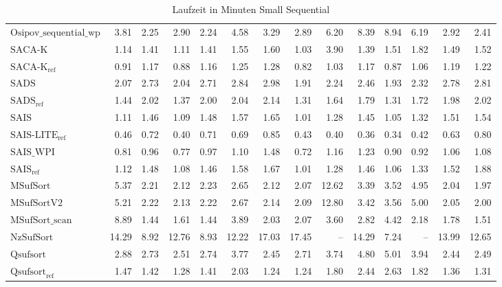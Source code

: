 \begin{table}
{\begin{tabular}{lrrrrrrrrrrrrr}
    $\text{Osipov\_sequential\_wp}$ & 3.81 & 2.25 & 2.90 & 2.24 & 4.58 & 3.29 & 2.89 & 6.20 & 8.39 & 8.94 & 6.19 & 2.92 & 2.41 \\
    $\text{SACA-K}$ & 1.14 & 1.41 & 1.11 & 1.41 & 1.55 & 1.60 & 1.03 & 3.90 & 1.39 & 1.51 & 1.82 & 1.49 & 1.52 \\
    $\text{SACA-K}_{\text{ref}}$ & 0.91 & 1.17 & 0.88 & 1.16 & 1.25 & 1.28 & 0.82 & 1.03 & 1.17 & 0.87 & 1.06 & 1.19 & 1.22 \\
    $\text{SADS}$ & 2.07 & 2.73 & 2.04 & 2.71 & 2.84 & 2.98 & 1.91 & 2.24 & 2.46 & 1.93 & 2.32 & 2.78 & 2.81 \\
    $\text{SADS}_{\text{ref}}$ & 1.44 & 2.02 & 1.37 & 2.00 & 2.04 & 2.14 & 1.31 & 1.64 & 1.79 & 1.31 & 1.72 & 1.98 & 2.02 \\
    $\text{SAIS}$ & 1.11 & 1.46 & 1.09 & 1.48 & 1.57 & 1.65 & 1.01 & 1.28 & 1.45 & 1.05 & 1.32 & 1.51 & 1.54 \\
    $\text{SAIS-LITE}_{\text{ref}}$ & {\color{green!60!black}0.46} & 0.72 & {\color{green!60!black}0.40} & 0.71 & 0.69 & 0.85 & {\color{green!60!black}0.43} & {\color{green!60!black}0.40} & {\color{green!60!black}0.36} & {\color{green!60!black}0.34} & {\color{green!60!black}0.42} & 0.63 & 0.80 \\
    $\text{SAIS\_WPI}$ & 0.81 & 0.96 & 0.77 & 0.97 & 1.10 & 1.48 & 0.72 & 1.16 & 1.23 & 0.90 & 0.92 & 1.06 & 1.08 \\
    $\text{SAIS}_{\text{ref}}$ & 1.12 & 1.48 & 1.08 & 1.46 & 1.58 & 1.67 & 1.01 & 1.28 & 1.46 & 1.06 & 1.33 & 1.52 & 1.88 \\
    $\text{MSufSort}$ & 5.37 & 2.21 & 2.12 & 2.23 & 2.65 & 2.12 & 2.07 & {\color{red}12.62} & 3.39 & 3.52 & 4.95 & 2.04 & 1.97 \\
    $\text{MSufSortV2}$ & 5.21 & 2.22 & 2.13 & 2.22 & 2.67 & 2.14 & 2.09 & {\color{red}12.80} & 3.42 & 3.56 & 5.00 & 2.05 & 2.00 \\
    $\text{MSufSort\_scan}$ & 8.89 & 1.44 & 1.61 & 1.44 & 3.89 & 2.03 & 2.07 & 3.60 & 2.82 & 4.42 & 2.18 & 1.78 & 1.51 \\
    $\text{NzSufSort}$ & {\color{red}14.29} & {\color{red}8.92} & {\color{red}12.76} & {\color{red}8.93} & 12.22 & {\color{red}17.03} & {\color{red}17.45} & {\color{darkgray}--} & 14.29 & 7.24 & {\color{darkgray}--} & {\color{red}13.99} & {\color{red}12.65} \\
    $\text{Qsufsort}$ & 2.88 & 2.73 & 2.51 & 2.74 & 3.77 & 2.45 & 2.71 & 3.74 & 4.80 & 5.01 & 3.94 & 2.44 & 2.49 \\
    $\text{Qsufsort}_{\text{ref}}$ & 1.47 & 1.42 & 1.28 & 1.41 & 2.03 & 1.24 & 1.24 & 1.80 & 2.44 & 2.63 & 1.82 & 1.36 & 1.31 \\
\bottomrule
\end{tabular}
}
\caption{Laufzeit in Minuten Small Sequential}
\label{messung:tab:mem-small-seq-none}
\end{table}
